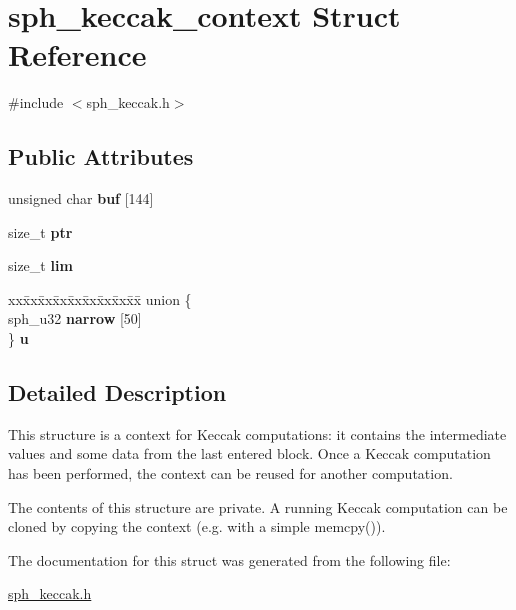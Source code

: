 \hypertarget{structsph__keccak__context}{}\section{sph\+\_\+keccak\+\_\+context Struct Reference}
\label{structsph__keccak__context}


{\ttfamily \#include $<$sph\+\_\+keccak.\+h$>$}

\subsection*{Public Attributes}
\begin{DoxyCompactItemize}
\item 
\mbox{\label{structsph__keccak__context_a05befb157f151a3801b923e6fa910b9e}} 
unsigned char {\bfseries buf} \mbox{[}144\mbox{]}
\item 
\mbox{\label{structsph__keccak__context_a3f5799de9b58573925c8657ce5373f9c}} 
size\+\_\+t {\bfseries ptr}
\item 
\mbox{\label{structsph__keccak__context_a79b7eb8376dd39e5a0d0964dc7b78838}} 
size\+\_\+t {\bfseries lim}
\item 
\mbox{\label{structsph__keccak__context_a5f61348e39a067f69f0dc6002fa30fa7}} 
\begin{tabbing}
xx\=xx\=xx\=xx\=xx\=xx\=xx\=xx\=xx\=\kill
union \{\\
\>sph\_u32 {\bfseries narrow} \mbox{[}50\mbox{]}\\
\} {\bfseries u}\\

\end{tabbing}\end{DoxyCompactItemize}


\subsection{Detailed Description}
This structure is a context for Keccak computations\+: it contains the intermediate values and some data from the last entered block. Once a Keccak computation has been performed, the context can be reused for another computation.

The contents of this structure are private. A running Keccak computation can be cloned by copying the context (e.\+g. with a simple {\ttfamily memcpy()}). 

The documentation for this struct was generated from the following file\+:\begin{DoxyCompactItemize}
\item 
\mbox{\hyperlink{sph__keccak_8h}{sph\+\_\+keccak.\+h}}\end{DoxyCompactItemize}
